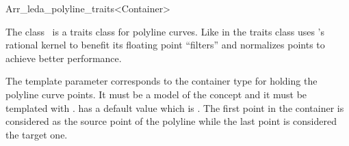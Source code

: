 
\ccRefPageBegin

\begin{ccRefClass}{Arr_leda_polyline_traits<Container>}

\ccDefinition
    The class \ccRefName\ is a traits class for polyline curves. Like
    in  the traits class uses
    \leda\/'s rational kernel to benefit its floating point ``filters'' and
    normalizes points to achieve better performance.

    The template parameter  corresponds to the
    container type for holding the polyline curve points. It must be a
    model of the  concept and it must be
    templated with .  has a default
    value which is . The first point
    in the container is considered as the source point of the
    polyline while the last point is considered the target one.





\ccIsModel
     

\ccSeeAlso
    \\

\end{ccRefClass}



\ccRefPageEnd
